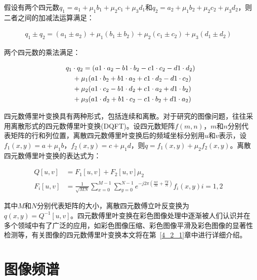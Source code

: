 假设有两个四元数$q_{1}=a_{1}+\mu_{1}b_{1}+\mu_{2}c_{1}+\mu_{3}d_{1}$和$q_{2}=a_{2}+\mu_{1}b_{2}+\mu_{2}c_{2}+\mu_{3}d_{2}$，则二者之间的加减法运算满足：
\begin{linenomath}
\begin{align}
q_{1}\pm q_{2}=(a_{1}\pm a_{2})+\mu_{1}(b_{1}\pm b_{2})+\mu_{2}(c_{1}\pm c_{2})+\mu_{3}(d_{1}\pm d_{2})
\label{式2_31}
\end{align}
\end{linenomath}
两个四元数的乘法满足：
\begin{linenomath}
\begin{align}
\lefteqn{ q_{1}\cdot q_{2}=(a{1}\cdot a_{2}-b{1}\cdot b_{2}-c{1}\cdot c_{2}-d{1}\cdot d_{2}) {}}\nonumber\\
&& {}+\mu_{1}(a{1}\cdot b_{2}+b{1}\cdot a_{2}+c{1}\cdot d_{2}-d{1}\cdot c_{2})\nonumber\\
&& {}+\mu_{2}(a{1}\cdot c_{2}-b{1}\cdot d_{2}+c{1}\cdot a_{2}+d{1}\cdot b_{2})\nonumber\\
&& {}+\mu_{3}(a{1}\cdot d_{2}+b{1}\cdot c_{2}-c{1}\cdot b_{2}+d{1}\cdot a_{2})
\label{式2_32}
\end{align}
\end{linenomath}

四元数傅里叶变换具有两种形式，包括连续和离散。对于研究的图像问题，往往采用离散形式的四元数傅里叶变换(DQFT)。设四元数矩阵$f(m,n)$，$m$和$n$分别代表矩阵的行和列位置，离散四元数傅里叶变换后的频域坐标分别用$u$和$v$表示，设$f_{1}(x,y)=a+\mu_{1} b$，$f_{2}(x,y)=c+\mu_{1} d$，则$q=f_{1}(x,y)+\mu_{2}f_{2}(x,y)$。离散四元数傅里叶变换的表达式为：
\begin{linenomath}
\begin{align}
Q[u,v] &= F_{1}[u,v]+F_{2}[u,v]\mu_{2}\label{式2_33}\\
F_{i}[u,v] &= \frac{1}{\sqrt{MN}}\sum_{x=0}^{M-1}\sum_{y=0}^{N-1}e^{-j2\pi (\frac{ux}{M}+\frac{vy}{N})}f_{i}(x,y)  i=1,2\label{式2_34}
\end{align}
\end{linenomath}
其中$M$和$N$分别代表矩阵的大小，离散四元数傅立叶反变换为$q(x,y)=Q^{-1}[u,v]$。四元数傅里叶变换在彩色图像处理中逐渐被人们认识并在多个领域中有了广泛的应用，如彩色图像压缩、彩色图像平滑及彩色图像的显著性检测等，有关图像的四元数傅里叶变换本文将在第~\ref{4_2_1}章中进行详细介绍。
\section{图像频谱}
\label{2_3}

